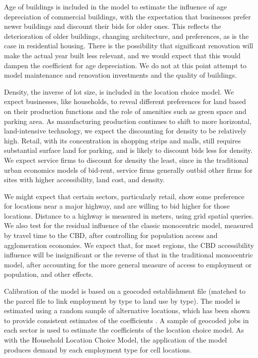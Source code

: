 \documentclass[fleqn]{article}
\begin{document}
Age of buildings is included in the model to estimate the
influence of age depreciation of commercial buildings, with the
expectation that businesses prefer newer buildings and discount
their bids for older ones.  This reflects the deterioration of
older buildings, changing architecture, and preferences, as is the
case in residential housing.  There is the possibility that
significant renovation will make the actual year built less
relevant, and we would expect that this would dampen the
coefficient for age depreciation.  We do not at this point attempt
to model maintenance and renovation investments and the quality of
buildings.

Density, the inverse of lot size, is included in the location
choice model.  We expect businesses, like households, to reveal
different preferences for land based on their production functions
and the role of amenities such as green space and parking area. As
manufacturing production continues to shift to more horizontal,
land-intensive technology, we expect the discounting for density
to be relatively high.  Retail, with its concentration in shopping
strips and malls, still requires substantial surface land for
parking, and is likely to discount bids less for density.  We
expect service firms to discount for density the least, since in
the traditional urban economics models of bid-rent, service firms
generally outbid other firms for sites with higher accessibility,
land cost, and density.

We might expect that certain sectors, particularly retail, show
some preference for locations near a major highway, and are
willing to bid higher for those locations.  Distance to a highway
is measured in meters, using grid spatial queries.  We also test
for the residual influence of the classic monocentric model,
measured by travel time to the CBD, after controlling for
population access and agglomeration economies.  We expect that,
for most regions, the CBD accessibility influence will be
insignificant or the reverse of that in the traditional
monocentric model, after accounting for the more general measure of
access to employment or population, and other effects.

Calibration of the model is based on a geocoded establishment file
(matched to the parcel file to link employment by type to land use
by type).  The model is estimated using a random sample of
alternative locations, which has been shown to provide consistent
estimates of the coefficients \cite{ben-akiva-lerman-1987}.  A
sample of geocoded jobs in each sector is used to estimate the
coefficients of the location choice model. As with the Household
Location Choice Model, the application of the model produces
demand by each employment type for cell locations.
\end{document}

